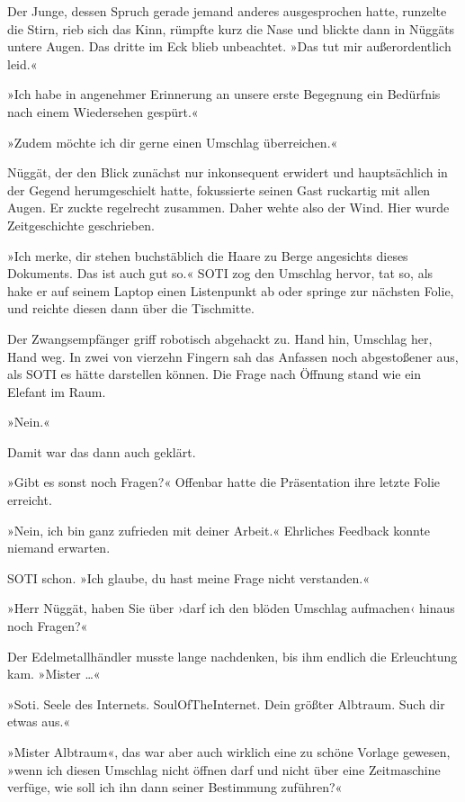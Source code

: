 Der Junge, dessen Spruch gerade jemand anderes ausgesprochen hatte, runzelte die Stirn, rieb sich das Kinn, rümpfte kurz die Nase und blickte dann in Nüggäts untere Augen. Das dritte im Eck blieb unbeachtet. »Das tut mir außerordentlich leid.«


»Ich habe in angenehmer Erinnerung an unsere erste Begegnung ein Bedürfnis nach einem Wiedersehen gespürt.«


»Zudem möchte ich dir gerne einen Umschlag überreichen.«

Nüggät, der den Blick zunächst nur inkonsequent erwidert und hauptsächlich in der Gegend herumgeschielt hatte, fokussierte seinen Gast ruckartig mit allen Augen. Er zuckte regelrecht zusammen. Daher wehte also der Wind. Hier wurde Zeitgeschichte geschrieben.

»Ich merke, dir stehen buchstäblich die Haare zu Berge angesichts dieses Dokuments. Das ist auch gut so.« SOTI zog den Umschlag hervor, tat so, als hake er auf seinem Laptop einen Listenpunkt ab oder springe zur nächsten Folie, und reichte diesen dann über die Tischmitte.

Der Zwangsempfänger griff robotisch abgehackt zu. Hand hin, Umschlag her, Hand weg. In zwei von vierzehn Fingern sah das Anfassen noch abgestoßener aus, als SOTI es hätte darstellen können. Die Frage nach Öffnung stand wie ein Elefant im Raum.

»Nein.«

Damit war das dann auch geklärt.

»Gibt es sonst noch Fragen?« Offenbar hatte die Präsentation ihre letzte Folie erreicht.

»Nein, ich bin ganz zufrieden mit deiner Arbeit.« Ehrliches Feedback konnte niemand erwarten.

SOTI schon. »Ich glaube, du hast meine Frage nicht verstanden.«


»Herr Nüggät, haben Sie über ›darf ich den blöden Umschlag aufmachen‹ hinaus noch Fragen?«

Der Edelmetallhändler musste lange nachdenken, bis ihm endlich die Erleuchtung kam. »Mister …«

»Soti. Seele des Internets. SoulOfTheInternet. Dein größter Albtraum. Such dir etwas aus.«

»Mister Albtraum«, das war aber auch wirklich eine zu schöne Vorlage gewesen, »wenn ich diesen Umschlag nicht öffnen darf und nicht über eine Zeitmaschine verfüge, wie soll ich ihn dann seiner Bestimmung zuführen?«

